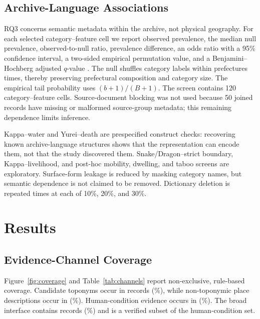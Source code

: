 \documentclass{isprs}
\begin{document}
\subsection{Archive-Language Associations}

RQ3 concerns semantic metadata within the archive, not physical geography. For each selected category--feature cell we report observed prevalence, the median null prevalence, observed-to-null ratio, prevalence difference, an odds ratio with a 95\% confidence interval, a two-sided empirical permutation value, and a Benjamini--Hochberg adjusted \(q\)-value \cite{benjamini1995}. The null shuffles category labels within prefectures \PermutationCount{} times, thereby preserving prefectural composition and category size. The empirical tail probability uses \((b+1)/(B+1)\). The screen contains 120 category--feature cells. Source-document blocking was not used because 50 joined records have missing or malformed source-group metadata; this remaining dependence limits inference.

Kappa--water and Yurei--death are prespecified construct checks: recovering known archive-language structures shows that the representation can encode them, not that the study discovered them. Snake/Dragon--strict boundary, Kappa--livelihood, and post-hoc mobility, dwelling, and taboo screens are exploratory. Surface-form leakage is reduced by masking category names, but semantic dependence is not claimed to be removed. Dictionary deletion is repeated \RobustnessReplicates{} times at each of 10\%, 20\%, and 30\%.

\section{Results}

\subsection{Evidence-Channel Coverage}

Figure~\ref{fig:coverage} and Table~\ref{tab:channels} report non-exclusive, rule-based coverage. Candidate toponyms occur in \CandidateToponymCount{} records (\CandidateToponymPercent\%), while non-toponymic place descriptions occur in \PlaceDescriptionCount{} (\PlaceDescriptionPercent\%). Human-condition evidence occurs in \HumanConditionCount{} (\HumanConditionPercent\%). The broad interface contains \BroadInterfaceCount{} records (\BroadInterfacePercent\%) and is a verified subset of the human-condition set.
\end{document}
